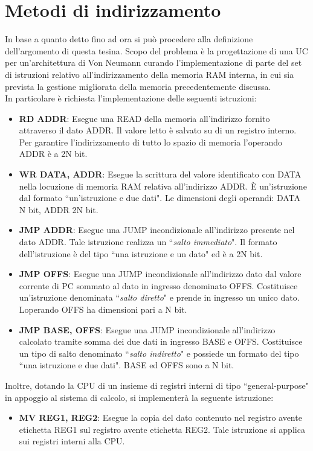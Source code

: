 \section*{Metodi di indirizzamento}
\label{metodi_di_indirizzamento}
In base a quanto detto fino ad ora si può procedere alla definizione dell'argomento di questa tesina. Scopo del problema è la progettazione di una UC per un'architettura di Von Neumann curando l'implementazione di parte del set di istruzioni relativo all'indirizzamento della memoria RAM interna, in cui sia prevista la gestione migliorata della memoria precedentemente discussa.\\
In particolare è richiesta l'implementazione delle seguenti istruzioni:
\begin{itemize}
	\item \textbf{RD ADDR}: Esegue una READ della memoria all'indirizzo fornito attraverso il dato ADDR. Il valore letto è salvato su di un registro interno. Per garantire l'indirizzamento di tutto lo spazio di memoria l'operando ADDR è a 2N bit.
	\item \textbf{WR DATA, ADDR}: Esegue la scrittura del valore identificato con DATA nella locuzione di memoria RAM relativa all'indirizzo ADDR. È un'istruzione dal formato \textquotedblleft un'istruzione e due dati".
	Le dimensioni degli operandi: DATA N bit, ADDR 2N bit.
	\item \textbf{JMP ADDR}: Esegue una JUMP incondizionale all'indirizzo presente nel dato ADDR. Tale istruzione realizza un \textquotedblleft \textit{salto immediato}". Il formato dell'istruzione è del tipo \textquotedblleft una istruzione e un dato" ed è a 2N bit.
	\item \textbf{JMP OFFS}: Esegue una JUMP incondizionale all'indirizzo dato dal valore corrente di PC sommato al dato in ingresso denominato OFFS. Costituisce un'istruzione denominata \textquotedblleft \textit{salto diretto}" e prende in ingresso un unico dato. Loperando OFFS ha dimensioni pari a N bit.
	\item \textbf{JMP BASE, OFFS}: Esegue una JUMP incondizionale all'indirizzo calcolato tramite somma dei due dati in ingresso BASE e OFFS. Costituisce un tipo di salto denominato \textquotedblleft \textit{salto indiretto}" e possiede un formato del tipo \textquotedblleft una istruzione e due dati". BASE ed OFFS sono a N bit.
\end{itemize}
Inoltre, dotando la CPU di un insieme di registri interni di tipo \textquotedblleft general-purpose" in appoggio al sistema di calcolo, si implementerà la seguente istruzione:
\begin{itemize}
	\item \textbf{MV REG1, REG2}: Esegue la copia del dato contenuto nel registro avente etichetta REG1 sul registro avente etichetta REG2. Tale istruzione si applica sui registri interni alla CPU.
\end{itemize}

